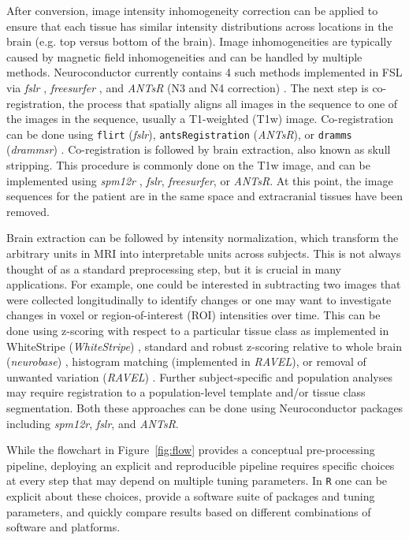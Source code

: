 \documentclass[]{elsarticle} %
\newcommand{\code}[1]{\texttt{#1}}
\newcommand{\pkg}[1]{\emph{#1}}
\newcommand{\rlang}{\texttt{R}}
\begin{document}
After conversion, image intensity inhomogeneity correction can be applied to ensure that each tissue has similar intensity distributions across locations in the brain (e.g. top versus bottom of the brain). Image inhomogeneities are typically caused by magnetic field inhomogeneities and can be handled by multiple methods. Neuroconductor currently contains 4 such methods implemented in FSL via \pkg{fslr} \cite{zhang_segmentation_2001},  \pkg{freesurfer} \cite{sled_nonparametric_1998}, and \pkg{ANTsR} (N3 and N4 correction) \cite{sled_nonparametric_1998,tustison_n4itk:_2010}.  The next step is co-registration, the process that spatially aligns all images in the sequence to one of the images in the sequence, usually a T1-weighted (T1w) image.  Co-registration can be done using \code{flirt} (\pkg{fslr}), \code{antsRegistration} (\pkg{ANTsR}), or \code{dramms} (\pkg{drammsr}) \cite{dramms}. Co-registration is followed by brain extraction, also known as skull stripping.  This procedure is commonly done on the T1w image, and can be implemented using \pkg{spm12r} \cite{spm,spm12r}, \pkg{fslr}, \pkg{freesurfer}, or \pkg{ANTsR}. At this point, the image sequences for the patient are in the same space and extracranial tissues have been removed.

Brain extraction can be followed by intensity normalization,  which transform the arbitrary units in MRI into interpretable units across subjects. This is not always thought of as a standard preprocessing step, but it is crucial in many applications. For example, one could be interested in subtracting two images that were collected longitudinally to identify changes or one may want to investigate changes in voxel or region-of-interest (ROI) intensities over time.  This can be done using z-scoring with respect to a particular tissue class as implemented in WhiteStripe (\pkg{WhiteStripe}) \citep{whitestripe}, standard and robust z-scoring relative to whole brain (\pkg{neurobase}) \cite{neurobase}, histogram matching (implemented in \pkg{RAVEL}), or removal of unwanted variation (\pkg{RAVEL}) \citep{ravel}.  Further subject-specific and population analyses may require registration to a population-level template and/or tissue class segmentation. Both these approaches can be done using Neuroconductor packages including \pkg{spm12r}, \pkg{fslr}, and \pkg{ANTsR}.

While the flowchart in Figure~\ref{fig:flow} provides a conceptual pre-processing pipeline, deploying an explicit and reproducible pipeline requires specific choices at every step that may depend on multiple tuning parameters. In {\rlang} one can be explicit about these choices, provide a software suite of packages and tuning parameters, and quickly compare results based on different combinations of software and platforms.  
\end{document}
